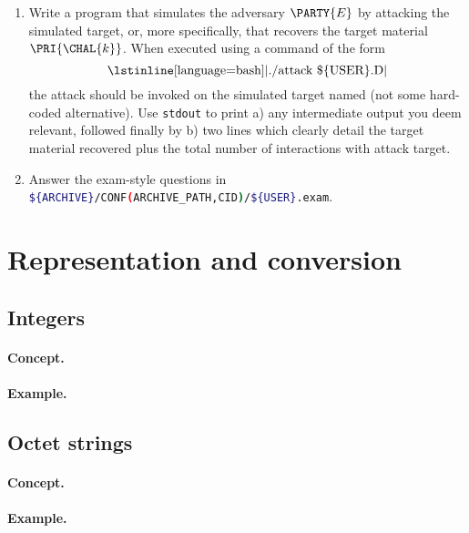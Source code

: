 \documentclass[crop={false},multi={true},tikz={true}]{standalone}
\begin{document}

\begin{enumerate}
\item Write a program that simulates the adversary $\PARTY{E}$ by attacking
      the simulated target, or, more specifically, that recovers the target 
      material $\PRI{\CHAL{k}}$.  
      When executed using a command of the form
      \[
      \mbox{\lstinline[language={bash}]|./attack \$\{USER\}.D|}
      \]
      the attack should be invoked on the simulated target named (not some
      hard-coded alternative).  Use \lstinline[language={bash}]{stdout} to 
      print 
      a) any intermediate output you deem relevant, followed finally by 
      b) two lines which clearly detail the target material recovered plus
         the total number of interactions with attack target.
\item Answer the exam-style questions in 
      \lstinline[language={bash}]|${ARCHIVE}/CONF(ARCHIVE_PATH,CID)/${USER}.exam|.
\end{enumerate}


\ifstandalone
\printbibliography
\fi


\ifstandalone
\appendix 
\section{Representation and conversion}

\subsection{Integers}

\paragraph{Concept.}

\paragraph{Example.}


\subsection{Octet strings}

\paragraph{Concept.}

\paragraph{Example.}

\fi

\end{document}
